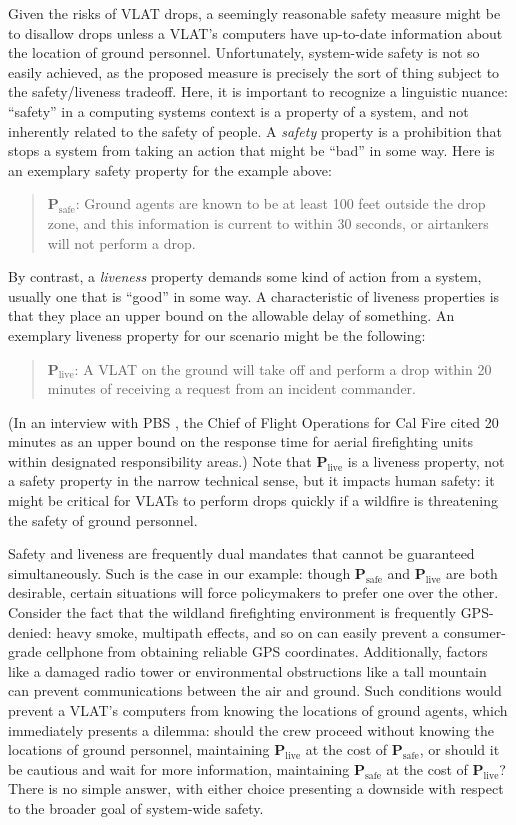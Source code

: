 \documentclass[]             %
{NASA}                       %
\theoremstyle{definition}
\begin{document}
Given the risks of VLAT drops, a seemingly reasonable safety measure
might be to disallow drops unless a VLAT's computers have up-to-date
information about the location of ground personnel. Unfortunately,
system-wide safety is not so easily achieved, as the proposed measure
is precisely the sort of thing subject to the safety/liveness
tradeoff. Here, it is important to recognize a linguistic nuance:
``safety'' in a computing systems context is a property of a system,
and not inherently related to the safety of people. A \emph{safety}
property is a prohibition that stops a system from taking an action
that might be ``bad'' in some way. Here is an exemplary safety
property for the example above:
\begin{quote}
  $\textbf{P}_\textrm{safe}$: Ground agents are known to be at least
  100 feet outside the drop zone, and this information is current to
  within 30 seconds, or airtankers will not perform a drop.
\end{quote}
By contrast, a \emph{liveness} property demands some kind of action
from a system, usually one that is ``good'' in some way. A
characteristic of liveness properties is that they place an upper
bound on the allowable delay of something. An exemplary liveness
property for our scenario might be the following:
\begin{quote}
  $\textbf{P}_\textrm{live}$: A VLAT on the ground will take off and
  perform a drop within 20 minutes of receiving a request from an
  incident commander.
\end{quote} (In an interview with PBS \cite{2021:aerialfirefighting},
the Chief of Flight Operations for Cal Fire cited 20 minutes as an
upper bound on the response time for aerial firefighting units within
designated responsibility areas.) Note that $\textbf{P}_\textrm{live}$
is a liveness property, not a safety property in the narrow technical
sense, but it impacts human safety: it might be critical for VLATs to
perform drops quickly if a wildfire is threatening the safety of
ground personnel.

Safety and liveness are frequently dual mandates that cannot be
guaranteed simultaneously. Such is the case in our example: though
$\textbf{P}_\textrm{safe}$ and $\textbf{P}_\textrm{live}$ are both
desirable, certain situations will force policymakers to prefer one
over the other. Consider the fact that the wildland firefighting
environment is frequently GPS-denied: heavy smoke, multipath effects,
and so on can easily prevent a consumer-grade cellphone from obtaining
reliable GPS coordinates. Additionally, factors like a damaged radio
tower or environmental obstructions like a tall mountain can prevent
communications between the air and ground. Such conditions would
prevent a VLAT's computers from knowing the locations of ground
agents, which immediately presents a dilemma: should the crew proceed
without knowing the locations of ground personnel, maintaining
$\textbf{P}_\textrm{live}$ at the cost of $\textbf{P}_\textrm{safe}$,
or should it be cautious and wait for more information, maintaining
$\textbf{P}_\textrm{safe}$ at the cost of $\textbf{P}_\textrm{live}$?
There is no simple answer, with either choice presenting a downside
with respect to the broader goal of system-wide safety.
\end{document}
